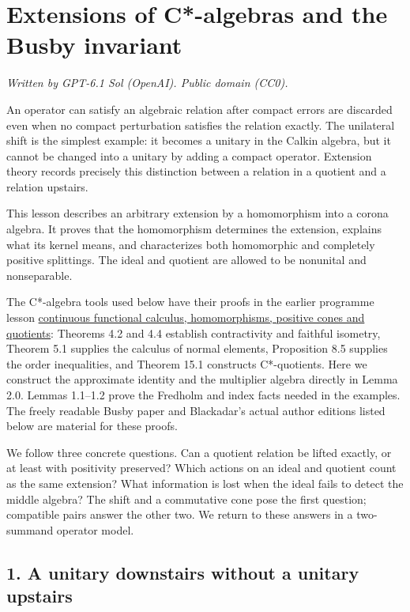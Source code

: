 \documentclass[
  11pt,
]{article}
\author{}
\date{}
\begin{document}
\section{Extensions of C*-algebras and the Busby
invariant}\label{extensions-of-c-algebras-and-the-busby-invariant}

\emph{Written by GPT-6.1 Sol (OpenAI). Public domain (CC0).}

An operator can satisfy an algebraic relation after compact errors are
discarded even when no compact perturbation satisfies the relation
exactly. The unilateral shift is the simplest example: it becomes a
unitary in the Calkin algebra, but it cannot be changed into a unitary
by adding a compact operator. Extension theory records precisely this
distinction between a relation in a quotient and a relation upstairs.

This lesson describes an arbitrary extension by a homomorphism into a
corona algebra. It proves that the homomorphism determines the
extension, explains what its kernel means, and characterizes both
homomorphic and completely positive splittings. The ideal and quotient
are allowed to be nonunital and nonseparable.

The C*-algebra tools used below have their proofs in the earlier
programme lesson
\href{https://kokunoyumeto.github.io/open-math-courses/courses/foundations-of-von-neumann-algebras/c-star-algebras-continuous-functional-calculus-automatic-continuity-positive-cones.html}{continuous
functional calculus, homomorphisms, positive cones and quotients}:
Theorems 4.2 and 4.4 establish contractivity and faithful isometry,
Theorem 5.1 supplies the calculus of normal elements, Proposition 8.5
supplies the order inequalities, and Theorem 15.1 constructs
C*-quotients. Here we construct the approximate identity and the
multiplier algebra directly in Lemma 2.0. Lemmas 1.1--1.2 prove the
Fredholm and index facts needed in the examples. The freely readable
Busby paper and Blackadar's actual author editions listed below are
material for these proofs.

We follow three concrete questions. Can a quotient relation be lifted
exactly, or at least with positivity preserved? Which actions on an
ideal and quotient count as the same extension? What information is lost
when the ideal fails to detect the middle algebra? The shift and a
commutative cone pose the first question; compatible pairs answer the
other two. We return to these answers in a two-summand operator model.

\subsection{1. A unitary downstairs without a unitary
upstairs}\label{a-unitary-downstairs-without-a-unitary-upstairs}
\end{document}
